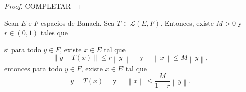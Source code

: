 \begin{proof}
	\color{red} COMPLETAR
\end{proof}

\begin{lemma}
	Sean $E$ e $F$ espacios de Banach. Sea $T \in \mathcal{L}(E, F)$. Entonces, existe $M > 0$ y $r \in (0, 1)$ tales que
	\begin{center}
		\begin{minipage}{0.9\linewidth}
			si para todo $y \in F$, existe $x \in E$ tal que
			\begin{equation*}
				\left\lVert y - T(x) \right\rVert \leq r \left\lVert y \right\rVert \quad \text{ y } \quad \left\lVert x \right\rVert \leq M \left\lVert y \right\rVert,
			\end{equation*}
			entonces para todo $y \in F$, existe $x \in E$ tal que
			\begin{equation*}
				y = T(x) \quad \text{ y } \quad \left\lVert x \right\rVert \leq \frac{M}{1-r} \left\lVert y \right\rVert.
			\end{equation*}
		\end{minipage}
	\end{center}
\end{lemma}



